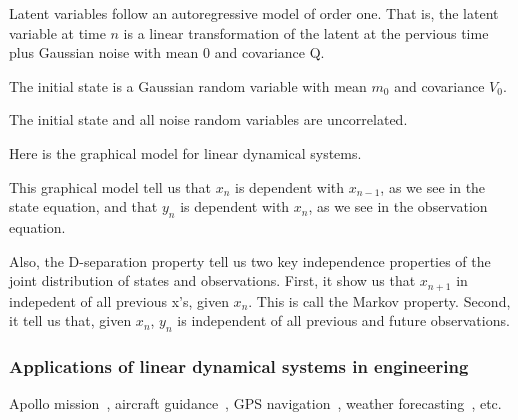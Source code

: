 \begin{frame}
{        \item Latent variables follow an autoregressive model of order one.
            That is, the latent variable at time $n$ is a linear transformation
            of the latent at the pervious time plus Gaussian noise with mean 0
            and covariance Q.

        \item The initial state is a Gaussian random variable with mean $m_0$
            and covariance $V_0$.

        \item The initial state and all noise random variables are
            uncorrelated.

        \item Here is the graphical model for linear dynamical systems.

            This graphical model tell us that $x_n$ is dependent with
            $x_{n-1}$, as we see in the state equation, and that $y_n$ is
            dependent with $x_n$, as we see in the observation equation.

            Also, the D-separation property tell us two key independence
            properties of the joint distribution of states and observations.
            First, it show us that $x_{n+1}$ in indepedent of all previous x's,
            given $x_n$. This is call the Markov property. Second, it tell us
            that, given $x_n$, $y_n$ is independent of all previous and future
            observations.

            \normalsize
        }

\end{frame}

\begin{frame}
    \frametitle{Applications of linear dynamical systems in engineering}

    Apollo mission~\citep{mcGeeAndSchmidt85}, aircraft
    guidance~\citep{schmidtEtAl70}, GPS
    navigation~\citep{hofmannAndLichtenegger97}, weather
    forecasting~\citep{buehnerEtAl17}, etc.

    \vspace{.1in}


    \note[itemize] {
        \scriptsize

        \item 

    }

\end{frame}

